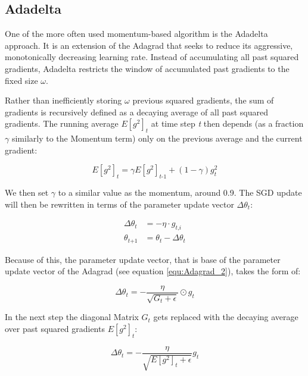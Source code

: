 \documentclass[12pt,oneside,a4paper,parskip]{scrbook}
\begin{document}
\subsection{Adadelta}
One of the more often used momentum-based algorithm is the Adadelta approach. It is an extension of the Adagrad that 
seeks to reduce its aggressive, monotonically decreasing learning rate. Instead of accumulating all past squared gradients, 
Adadelta restricts the window of accumulated past gradients to the fixed size $\omega$.  

Rather than inefficiently storing $\omega$ previous squared gradients, the sum of gradients is recursively defined as a 
decaying average of all past squared gradients. The running average $\textit{E}[\textit{g}^2]_t$  at time step \textit{t} 
then depends (as a fraction $\gamma $ similarly to the Momentum term) only on the previous average and the 
current gradient:

\begin{equation}
\textit{E}[\textit{g}^2]_t = \gamma\textit{E}[\textit{g}^2]_\textit{t-1} + (1-\gamma)\textit{g}^2_t
\label{equ:adadelta_1}
\end{equation}

We then set $\gamma$ to a similar value as the momentum, around 0.9. The SGD update will then be rewritten in terms of the 
parameter update vector $\Delta\theta_\textit{t}$:

\begin{equation}
  \begin{split}
    \Delta\theta_\textit{t} &= -\eta \cdot \textit{g}_\textit{t,i} \\
    \theta_\textit{t+1} &= \theta_\textit{t} - \Delta\theta_\textit{t}
  \end{split}
\end{equation}

Because of this, the parameter update vector, that is base of the parameter update vector of the Adagrad (see equation \ref{equ:Adagrad_2}), 
takes the form of:

\begin{equation}
  \Delta\theta_\textit{t} = -\frac{\eta}{\sqrt{\textit{G}_\textit{t} + \epsilon}} \odot \textit{g}_\textit{t}
\end{equation}

In the next step the diagonal Matrix $\textit{G}_t$ gets replaced with the decaying average over past squared gradients 
$\textit{E}[\textit{g}^2]_\textit{t}$:

\begin{equation}
  \Delta\theta_\textit{t} = -\frac{\eta}{\sqrt{\textit{E}[\textit{g}^2]_\textit{t} + \epsilon}} \textit{g}_\textit{t}
\end{equation}
\end{document}
